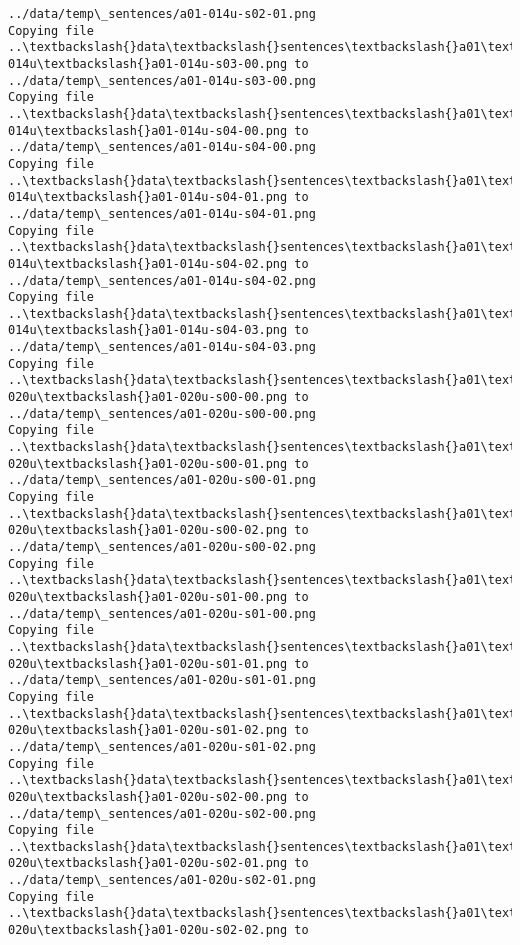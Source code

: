 \documentclass[11pt]{article}
\begin{document}
\begin{Verbatim}[commandchars=\\\{\}]
../data/temp\_sentences/a01-014u-s02-01.png
Copying file ..\textbackslash{}data\textbackslash{}sentences\textbackslash{}a01\textbackslash{}a01-014u\textbackslash{}a01-014u-s03-00.png to
../data/temp\_sentences/a01-014u-s03-00.png
Copying file ..\textbackslash{}data\textbackslash{}sentences\textbackslash{}a01\textbackslash{}a01-014u\textbackslash{}a01-014u-s04-00.png to
../data/temp\_sentences/a01-014u-s04-00.png
Copying file ..\textbackslash{}data\textbackslash{}sentences\textbackslash{}a01\textbackslash{}a01-014u\textbackslash{}a01-014u-s04-01.png to
../data/temp\_sentences/a01-014u-s04-01.png
Copying file ..\textbackslash{}data\textbackslash{}sentences\textbackslash{}a01\textbackslash{}a01-014u\textbackslash{}a01-014u-s04-02.png to
../data/temp\_sentences/a01-014u-s04-02.png
Copying file ..\textbackslash{}data\textbackslash{}sentences\textbackslash{}a01\textbackslash{}a01-014u\textbackslash{}a01-014u-s04-03.png to
../data/temp\_sentences/a01-014u-s04-03.png
Copying file ..\textbackslash{}data\textbackslash{}sentences\textbackslash{}a01\textbackslash{}a01-020u\textbackslash{}a01-020u-s00-00.png to
../data/temp\_sentences/a01-020u-s00-00.png
Copying file ..\textbackslash{}data\textbackslash{}sentences\textbackslash{}a01\textbackslash{}a01-020u\textbackslash{}a01-020u-s00-01.png to
../data/temp\_sentences/a01-020u-s00-01.png
Copying file ..\textbackslash{}data\textbackslash{}sentences\textbackslash{}a01\textbackslash{}a01-020u\textbackslash{}a01-020u-s00-02.png to
../data/temp\_sentences/a01-020u-s00-02.png
Copying file ..\textbackslash{}data\textbackslash{}sentences\textbackslash{}a01\textbackslash{}a01-020u\textbackslash{}a01-020u-s01-00.png to
../data/temp\_sentences/a01-020u-s01-00.png
Copying file ..\textbackslash{}data\textbackslash{}sentences\textbackslash{}a01\textbackslash{}a01-020u\textbackslash{}a01-020u-s01-01.png to
../data/temp\_sentences/a01-020u-s01-01.png
Copying file ..\textbackslash{}data\textbackslash{}sentences\textbackslash{}a01\textbackslash{}a01-020u\textbackslash{}a01-020u-s01-02.png to
../data/temp\_sentences/a01-020u-s01-02.png
Copying file ..\textbackslash{}data\textbackslash{}sentences\textbackslash{}a01\textbackslash{}a01-020u\textbackslash{}a01-020u-s02-00.png to
../data/temp\_sentences/a01-020u-s02-00.png
Copying file ..\textbackslash{}data\textbackslash{}sentences\textbackslash{}a01\textbackslash{}a01-020u\textbackslash{}a01-020u-s02-01.png to
../data/temp\_sentences/a01-020u-s02-01.png
Copying file ..\textbackslash{}data\textbackslash{}sentences\textbackslash{}a01\textbackslash{}a01-020u\textbackslash{}a01-020u-s02-02.png to

\end{Verbatim}
\end{document}
